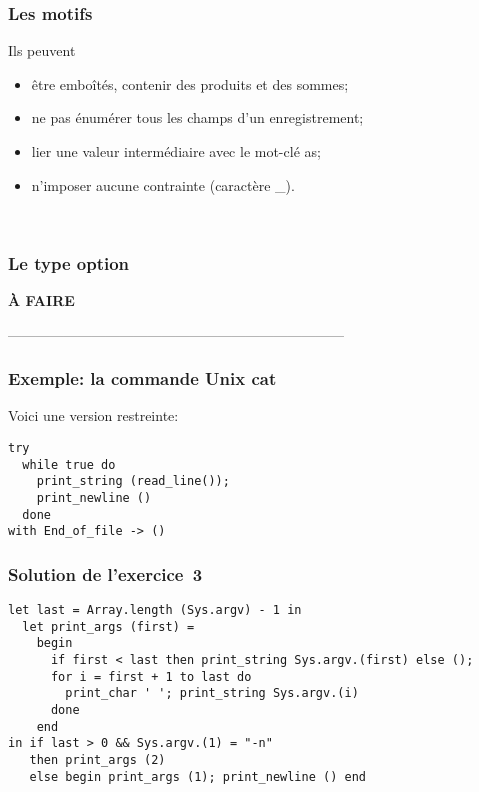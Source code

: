 %
\begin{frame}
\frametitle{Les motifs}


Ils peuvent

\begin{itemize}
  \item être emboîtés, contenir des produits et des sommes;

  \item ne pas énumérer tous les champs d'un enregistrement;

  \item lier une valeur intermédiaire avec le mot-clé \textsf{as};
 
  \item n'imposer aucune contrainte (caractère \textsf{\_}).
\end{itemize}

\\

\end{frame}


%
\begin{frame}
\frametitle{Le type option}

\centerline{\textbf{À FAIRE}}

\end{frame}

------------------------------------------------------------------------
%
\begin{frame}
\frametitle{Exemple: la commande Unix \textsf{cat}}

Voici une version restreinte:

\begin{verbatim}
try
  while true do
    print_string (read_line()); 
    print_newline ()
  done
with End_of_file -> ()
\end{verbatim}

\end{frame}

%
\begin{frame}
\frametitle{Solution de l'exercice~3}

\begin{verbatim}
let last = Array.length (Sys.argv) - 1 in
  let print_args (first) =
    begin
      if first < last then print_string Sys.argv.(first) else ();
      for i = first + 1 to last do
        print_char ' '; print_string Sys.argv.(i)
      done
    end
in if last > 0 && Sys.argv.(1) = "-n"
   then print_args (2)
   else begin print_args (1); print_newline () end
\end{verbatim}

\end{frame}

